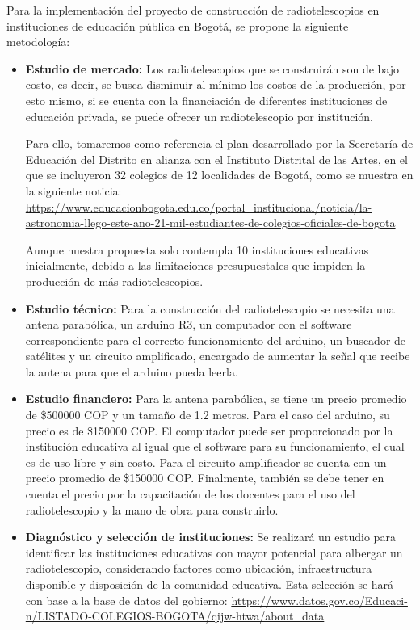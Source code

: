 Para la implementación del proyecto de construcción de radiotelescopios en
instituciones de educación pública en Bogotá, se propone la siguiente
metodología:

\begin{itemize}

\item \textbf{Estudio de mercado:} Los radiotelescopios que se construirán
son de bajo costo, es decir, se busca disminuir al mínimo los costos de la
producción, por esto mismo, si se cuenta con la financiación de diferentes
instituciones de educación privada, se puede ofrecer un radiotelescopio por
institución. 

Para ello, tomaremos como referencia el plan desarrollado por la Secretaría de 
Educación del Distrito en alianza con el Instituto Distrital de las Artes, en 
el que se incluyeron 32 colegios de 12 localidades de Bogotá, como se muestra 
en la siguiente noticia:
\url{https://www.educacionbogota.edu.co/portal_institucional/noticia/la-
astronomia-llego-este-ano-21-mil-estudiantes-de-colegios-oficiales-de-bogota}

Aunque nuestra propuesta solo contempla 10 instituciones educativas
inicialmente, debido a las limitaciones presupuestales que impiden la 
producción de más radiotelescopios.

\item \textbf{Estudio técnico:} Para la construcción del radiotelescopio se
necesita una antena parabólica, un arduino R3, un computador con el software
correspondiente para el correcto funcionamiento del arduino, un buscador de
satélites y un circuito amplificado, encargado de aumentar la señal que recibe
la antena para que el arduino pueda leerla.

\item \textbf{Estudio financiero:} Para la antena parabólica, se tiene un precio
promedio de \$500000 COP y un tamaño de 1.2 metros. Para el caso del arduino, su
precio es de \$150000 COP. El computador puede ser proporcionado por la
institución educativa al igual que el software para su funcionamiento, el cual
es de uso libre y sin costo. Para el circuito amplificador se cuenta con un
precio promedio de \$150000 COP. Finalmente, también se debe tener en cuenta el
precio por la capacitación de los docentes para el uso del radiotelescopio y la
mano de obra para construirlo.

\item \textbf{Diagnóstico y selección de instituciones:} Se realizará un estudio
para identificar las instituciones educativas con mayor potencial para albergar
un radiotelescopio, considerando factores como ubicación, infraestructura
disponible y disposición de la comunidad educativa. Esta selección se hará con
base a la base de datos del gobierno:
\url{https://www.datos.gov.co/Educaci-n/LISTADO-COLEGIOS-BOGOTA/qijw-htwa/about_data}


\end{itemize}
